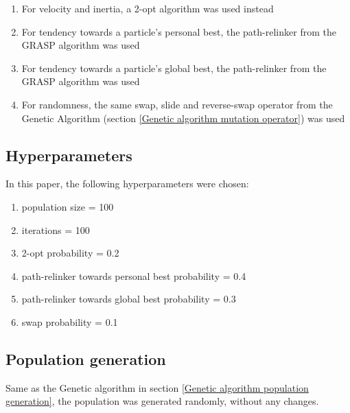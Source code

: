 \documentclass[conference]{IEEEtran}
\begin{document}
\begin{enumerate}
    \item For velocity and inertia, a 2-opt algorithm was used instead
    \item For tendency towards a particle's personal best, the path-relinker from the GRASP algorithm was used
    \item For tendency towards a particle's global best, the path-relinker from the GRASP algorithm was used
    \item For randomness, the same swap, slide and reverse-swap operator from the Genetic Algorithm (section \ref{Genetic algorithm mutation operator})
    was used
\end{enumerate}

\subsection{Hyperparameters}
In this paper, the following hyperparameters were chosen:
\begin{enumerate}
    \item population size = 100
    \item iterations = 100
    \item 2-opt probability = 0.2
    \item path-relinker towards personal best probability = 0.4
    \item path-relinker towards global best probability = 0.3
    \item swap probability = 0.1
\end{enumerate}

\subsection{Population generation}
Same as the Genetic algorithm in section \ref{Genetic algorithm population generation}, the population was generated randomly,
without any changes.
\end{document}
